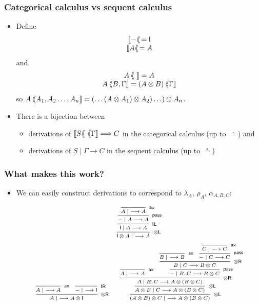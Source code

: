 \documentclass[10pt,t]{beamer}
\newcommand{\I}{\mathsf{I}}
\newcommand{\ot}{\otimes}
\newcommand{\al}{\alpha}
\newcommand{\lam}{\lambda}
\newcommand{\n}{{-}}
\newcommand{\tto}{\Longrightarrow}
\newcommand{\ax}{\mathsf{ax}}
\newcommand{\uf}{\mathsf{pass}}
\newcommand{\IL}{\I\mathsf{L}}
\newcommand{\otL}{\ot\mathsf{L}}
\newcommand{\IR}{\I\mathsf{R}}
\newcommand{\otR}{\ot\mathsf{R}}
\renewcommand{\vdash}{\longrightarrow}
\newcommand{\lb}{\langle\hspace*{-0.9mm}\langle}
\newcommand{\csem}[2]{#1\, \lb #2 \rrbracket}
\newcommand{\ssem}[1]{\llbracket #1 \lb\, }
\begin{document}

\begin{frame}

\frametitle{Categorical calculus vs sequent calculus}

\begin{itemize}

\item Define
\[
\begin{array}{c}
\ssem{\n} = \I \\ 
\ssem{A} = A
\end{array}
\]
and
\[
\begin{array}{c}
\csem{A}{~} = A \\
\csem{A}{B, \Gamma} = \csem{(A \otimes B)}{\Gamma}  
\end{array}
\]
so $\csem{A}{A_1, A_2 \ldots, A_n} = (\ldots (A \otimes A_1)
  \otimes A_2) \ldots) \otimes A_n$.

\bigskip

\item There is a bijection between
\begin{itemize}
\item derivations of
  $\csem{\ssem{S}}{\Gamma} \tto C$ in the categorical calculus (up to
  $\doteq$) and
\item derivations of  $S \mid \Gamma \vdash C$
  in the sequent calculus (up to $\circeq$) 
\end{itemize}

\end{itemize}

\end{frame}


\begin{frame}

\frametitle{What makes this work?}

\begin{itemize}

\item We can easily construct derivations to correspond to $\lam_A$,
  $\rho_A$, $\al_{A,B,C}$:

\[
\scriptsize
\infer[\otL]{\I \ot A \mid ~ \vdash A}{
  \infer[\IL]{\I \mid A \vdash A}{
    \infer[\uf]{\n \mid A \vdash A}{
      \infer[\ax]{A \mid ~ \vdash A}{
      }
    }
  }
}
\]
\[
\scriptsize
\infer[\otR]{A \mid ~ \vdash A \ot \I}{
  \infer[\ax]{A \mid ~ \vdash A}{
  }
  &
  \infer[\IR]{\n \mid ~ \vdash \I}{
  }
}
\qquad
\infer[\otL]{(A \ot B) \ot C \mid ~ \vdash A \ot (B \ot C)}{
  \infer[\otL]{A \ot B \mid C \vdash A \ot (B \ot C)}{
    \infer[\otR]{A \mid B, C \vdash A \ot (B \ot C)}{
      \infer[\ax]{A \mid ~ \vdash A}{
      }
      &
      \infer[\uf]{\n \mid B, C \vdash B \ot C}{
        \infer[\otR]{B \mid C \vdash B \ot C}{
          \infer[\ax]{B \mid ~ \vdash B}{
          }
          &
          \infer[\uf]{\n \mid C \vdash C}{
            \infer[\ax]{C \mid ~ \vdash C}{
            }
          }
        }
      }
    }
  }
}
\]


\end{itemize}

\end{frame}
\end{document}
